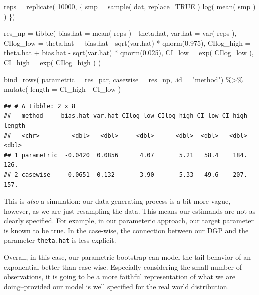 \documentclass[
]{book}
\newenvironment{Shaded}{\begin{snugshade}}{\end{snugshade}}
\newcommand{\AttributeTok}[1]{\textcolor[rgb]{0.77,0.63,0.00}{#1}}
\newcommand{\ConstantTok}[1]{\textcolor[rgb]{0.00,0.00,0.00}{#1}}
\newcommand{\DecValTok}[1]{\textcolor[rgb]{0.00,0.00,0.81}{#1}}
\newcommand{\FloatTok}[1]{\textcolor[rgb]{0.00,0.00,0.81}{#1}}
\newcommand{\FunctionTok}[1]{\textcolor[rgb]{0.00,0.00,0.00}{#1}}
\newcommand{\NormalTok}[1]{#1}
\newcommand{\OtherTok}[1]{\textcolor[rgb]{0.56,0.35,0.01}{#1}}
\newcommand{\SpecialCharTok}[1]{\textcolor[rgb]{0.00,0.00,0.00}{#1}}
\newcommand{\StringTok}[1]{\textcolor[rgb]{0.31,0.60,0.02}{#1}}
\begin{document}
\begin{Shaded}
\begin{Highlighting}[]
\NormalTok{reps }\OtherTok{=} \FunctionTok{replicate}\NormalTok{( }\DecValTok{10000}\NormalTok{, \{}
\NormalTok{    smp }\OtherTok{=} \FunctionTok{sample}\NormalTok{( dat, }\AttributeTok{replace=}\ConstantTok{TRUE}\NormalTok{ )}
    \FunctionTok{log}\NormalTok{( }\FunctionTok{mean}\NormalTok{( smp ) )}
\NormalTok{\})}

\NormalTok{res\_np }\OtherTok{=} \FunctionTok{tibble}\NormalTok{( }
  \AttributeTok{bias.hat =} \FunctionTok{mean}\NormalTok{( reps ) }\SpecialCharTok{{-}}\NormalTok{ theta.hat,}
  \AttributeTok{var.hat =} \FunctionTok{var}\NormalTok{( reps ),}
  \AttributeTok{CIlog\_low =}\NormalTok{ theta.hat }\SpecialCharTok{+}\NormalTok{ bias.hat }\SpecialCharTok{{-}} \FunctionTok{sqrt}\NormalTok{(var.hat) }\SpecialCharTok{*} \FunctionTok{qnorm}\NormalTok{(}\FloatTok{0.975}\NormalTok{),}
  \AttributeTok{CIlog\_high =}\NormalTok{ theta.hat }\SpecialCharTok{+}\NormalTok{ bias.hat }\SpecialCharTok{{-}} \FunctionTok{sqrt}\NormalTok{(var.hat) }\SpecialCharTok{*} \FunctionTok{qnorm}\NormalTok{(}\FloatTok{0.025}\NormalTok{),}
  \AttributeTok{CI\_low =} \FunctionTok{exp}\NormalTok{( CIlog\_low ),}
  \AttributeTok{CI\_high =} \FunctionTok{exp}\NormalTok{( CIlog\_high ) )}


\FunctionTok{bind\_rows}\NormalTok{( }\AttributeTok{parametric =}\NormalTok{ res\_par, }
           \AttributeTok{casewise =}\NormalTok{ res\_np, }\AttributeTok{.id =} \StringTok{"method"}\NormalTok{) }\SpecialCharTok{\%\textgreater{}\%}
  \FunctionTok{mutate}\NormalTok{( }\AttributeTok{length =}\NormalTok{ CI\_high }\SpecialCharTok{{-}}\NormalTok{ CI\_low )}
\end{Highlighting}
\end{Shaded}

\begin{verbatim}
## # A tibble: 2 x 8
##   method     bias.hat var.hat CIlog_low CIlog_high CI_low CI_high length
##   <chr>         <dbl>   <dbl>     <dbl>      <dbl>  <dbl>   <dbl>  <dbl>
## 1 parametric  -0.0420  0.0856      4.07       5.21   58.4    184.   126.
## 2 casewise    -0.0651  0.132       3.90       5.33   49.6    207.   157.
\end{verbatim}

This is \emph{also} a simulation: our data generating process is a bit more vague, however, as we are just resampling the data.
This means our estimands are not as clearly specified.
For example, in our parameteric approach, our target parameter is known to be true.
In the case-wise, the connection between our DGP and the parameter \texttt{theta.hat} is less explicit.

Overall, in this case, our parametric bootstrap can model the tail behavior of an exponential better than case-wise.
Especially considering the small number of observations, it is going to be a more faithful representation of what we are doing--provided our model is well specified for the real world distribution.

  
\end{document}
